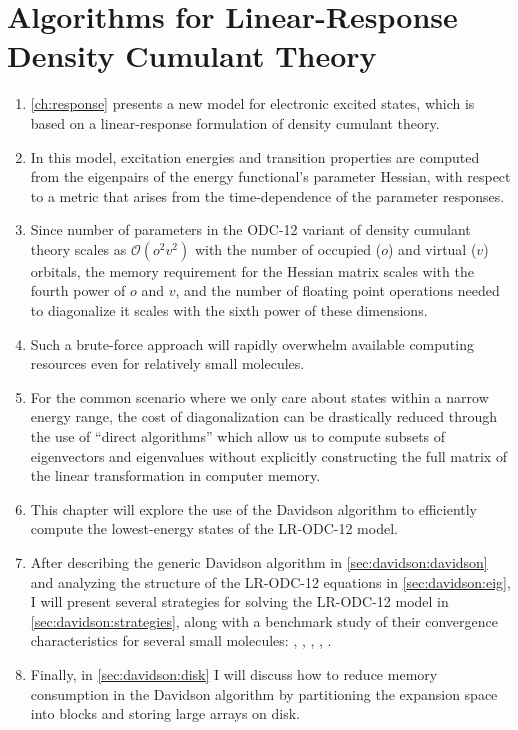 \chapter[%
    Algorithms for Linear-Response Density Cumulant Theory
]{%
    Algorithms for Linear-Response Density Cumulant Theory
}
\label{ch:davidson}

\begin{enumerate}
    \item
        \cref{ch:response} presents a new model for electronic excited states,
        which is based on a linear-response formulation of density cumulant
        theory.
    \item
        In this model, excitation energies and transition properties are
        computed from the eigenpairs of the energy functional's parameter
        Hessian, with respect to a metric that arises from the time-dependence
        of the parameter responses.
    \item
        Since number of parameters in the ODC-12 variant of density cumulant
        theory scales as
        \(
            \mathcal{O}(o^2v^2)
        \)
        with the number of occupied (\(o\)) and virtual (\(v\)) orbitals, the
        memory requirement for the Hessian matrix scales with the fourth power
        of \(o\) and \(v\), and the number of floating point operations needed
        to diagonalize it scales with the sixth power of these dimensions.
    \item
        Such a brute-force approach will rapidly overwhelm available computing
        resources even for relatively small molecules.
    \item
        For the common scenario where we only care about states within a narrow
        energy range, the cost of diagonalization can be drastically reduced
        through the use of ``direct algorithms'' which allow us to compute
        subsets of eigenvectors and eigenvalues without explicitly constructing
        the full matrix of the linear transformation in computer memory.
    \item
        This chapter will explore the use of the Davidson
        algorithm\cite{Liu:1978p49,Davidson:1975p87} to efficiently compute the
        lowest-energy states of the LR-ODC-12 model.
    \item
        After describing the generic Davidson algorithm in
        \cref{sec:davidson:davidson} and analyzing the structure of the
        LR-ODC-12 equations in \cref{sec:davidson:eig}, I will present several
        strategies for solving the LR-ODC-12 model in
        \cref{sec:davidson:strategies},
        along with a benchmark study of their convergence characteristics for
        several small molecules:
        , , , , .
    \item
        Finally, in \cref{sec:davidson:disk} I will discuss how to reduce memory
        consumption in the Davidson algorithm by partitioning the expansion
        space into blocks and storing large arrays on disk.
\end{enumerate}

